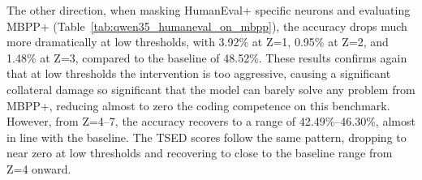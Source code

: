 \documentclass[mscthesis]{usiinfthesis}
\begin{document}
The other direction, when masking HumanEval+ specific neurons and evaluating MBPP+ (Table~\ref{tab:qwen35_humaneval_on_mbpp}), 
the accuracy drops much more dramatically at low thresholds, with 3.92\% at Z=1, 0.95\% at Z=2, and 1.48\% at Z=3, compared to the baseline of 48.52\%.
These results confirms again that at low thresholds the intervention is too aggressive, causing a significant collateral damage so significant
that the model can barely solve any problem from MBPP+, reducing almost to zero the coding competence on this benchmark.
However, from Z=4--7, the accuracy recovers to a range of 42.49\%--46.30\%, almost in line
with the baseline.
The TSED scores follow the same pattern, dropping to near zero at low thresholds and recovering to close to the baseline range from Z=4 onward.

\begin{table}[h]
\centering
\caption{Qwen3.5-2B: MBPP+ accuracy when masking HumanEval+ specific neurons.}
\label{tab:qwen35_humaneval_on_mbpp}
\end{table}
\end{document}
